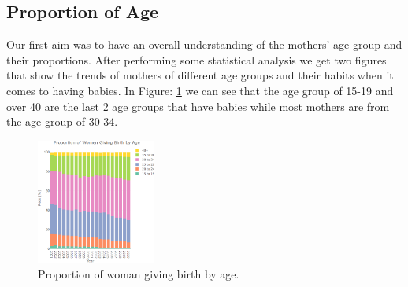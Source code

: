 \subsection{Proportion of Age}
Our first aim was to have an overall understanding of the mothers' age group and their proportions. After performing some statistical analysis we get two figures that show the trends of mothers of different age groups and their habits when it comes to having babies. In Figure: \ref{fig:age1} we can see that the age group of 15-19 and over 40 are the last 2 age groups that have babies while most mothers are from the age group of 30-34. 

\begin{figure}
  \centering
  \includegraphics[width=0.35\textwidth]{img/age_group.png}
  \caption{Proportion of woman giving birth by age.}
  \label{fig:age1}
\end{figure}
